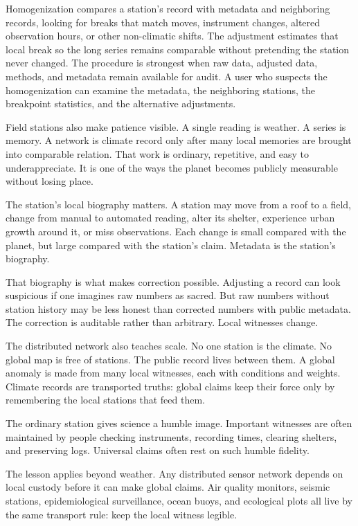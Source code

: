 Homogenization compares a station's record with metadata and neighboring
records, looking for breaks that match moves, instrument changes,
altered observation hours, or other non-climatic shifts. The adjustment
estimates that local break so the long series remains comparable without
pretending the station never changed. The procedure is strongest when
raw data, adjusted data, methods, and metadata remain available for
audit. A user who suspects the homogenization can examine the metadata,
the neighboring stations, the breakpoint statistics, and the alternative
adjustments.

Field stations also make patience visible. A single reading is weather.
A series is memory. A network is climate record only after many local
memories are brought into comparable relation. That work is ordinary,
repetitive, and easy to underappreciate. It is one of the ways the
planet becomes publicly measurable without losing place.

The station's local biography matters. A station may move from a roof to
a field, change from manual to automated reading, alter its shelter,
experience urban growth around it, or miss observations. Each change is
small compared with the planet, but large compared with the station's
claim. Metadata is the station's biography.

That biography is what makes correction possible. Adjusting a record can
look suspicious if one imagines raw numbers as sacred. But raw numbers
without station history may be less honest than corrected numbers with
public metadata. The correction is auditable rather than arbitrary. Local
witnesses change.

The distributed network also teaches scale. No one station is the
climate. No global map is free of stations. The public record lives
between them. A global anomaly is made from many local witnesses, each
with conditions and weights. Climate records are transported truths:
global claims keep their force only by remembering the local stations
that feed them.

The ordinary station gives science a humble image. Important witnesses
are often maintained by people checking instruments, recording times,
clearing shelters, and preserving logs. Universal claims often rest on
such humble fidelity.

The lesson applies beyond weather. Any distributed sensor network depends on
local custody before it can make global claims. Air quality monitors,
seismic stations, epidemiological surveillance, ocean buoys, and
ecological plots all live by the same transport rule: keep the local
witness legible.

